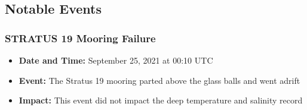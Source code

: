 \subsection{Notable Events}

\subsubsection{STRATUS 19 Mooring Failure}
\begin{itemize}
  \item \textbf{Date and Time:} September 25, 2021 at 00:10 UTC
  \item \textbf{Event:} The Stratus 19 mooring parted above the glass balls and went adrift
  \item \textbf{Impact:} This event did not impact the deep temperature and salinity record
\end{itemize}

